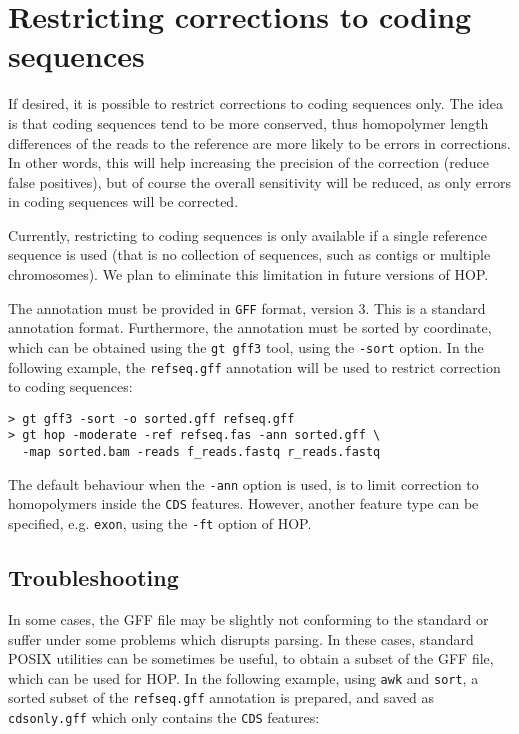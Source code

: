 \documentclass[12pt,titlepage]{article}
\newcommand{\Hop}{{HOP}\xspace}
\begin{document}
\section{Restricting corrections to coding sequences}

If desired, it is possible to restrict corrections to coding
sequences only. The idea is that coding sequences tend to be
more conserved, thus homopolymer length differences of the
reads to the reference are more likely to be errors in
corrections. In other words, this will help increasing the
precision of the correction (reduce false positives),
but of course the overall sensitivity will be reduced, as
only errors in coding sequences will be corrected.

Currently, restricting to coding sequences is only
available if a single reference sequence is used (that
is no collection of sequences, such as contigs or multiple
chromosomes). We plan to eliminate this limitation in future
versions of \Hop.

The annotation must be provided in \texttt{GFF} format, version 3.
This is a standard annotation format. Furthermore, the
annotation must be sorted by coordinate, which can be obtained
using the \texttt{gt gff3} tool, using the \texttt{-sort}
option. In the following example, the \texttt{refseq.gff} annotation
will be used to restrict correction to coding sequences:

\begin{footnotesize}
\begin{verbatim}
> gt gff3 -sort -o sorted.gff refseq.gff
> gt hop -moderate -ref refseq.fas -ann sorted.gff \
  -map sorted.bam -reads f_reads.fastq r_reads.fastq
\end{verbatim}
\end{footnotesize}

The default behaviour when the \texttt{-ann} option is used,
is to limit correction to homopolymers inside the \texttt{CDS}
features. However, another feature type can be specified,
e.g. \texttt{exon}, using the \texttt{-ft} option of \Hop.

\subsection{Troubleshooting}

In some cases, the GFF file may be slightly not conforming to
the standard or suffer under some problems which disrupts parsing.
In these cases, standard POSIX utilities can be sometimes be
useful, to obtain a subset of the GFF file, which can be
used for \Hop. In the following example, using \texttt{awk} and
\texttt{sort}, a sorted subset of the \texttt{refseq.gff}
annotation is prepared, and saved as \texttt{cdsonly.gff} which
only contains the \texttt{CDS} features:
\end{document}
